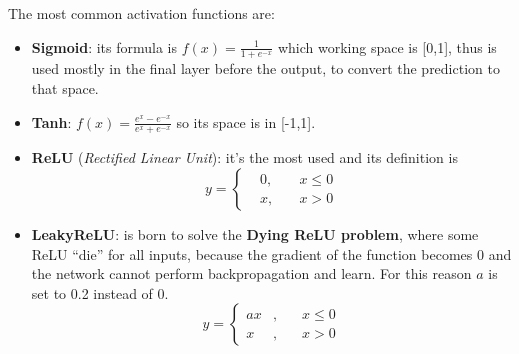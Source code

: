 \documentclass[oneside]{academica}
\begin{document}
The most common activation functions are:
\begin{itemize}
  \item \textbf{Sigmoid}: its formula is $f(x) = \displaystyle \frac{1}{1+e^{-x}}$ which working space is [0,1], thus is used mostly in the final layer before the output, to convert the prediction to that space.
  \item \textbf{Tanh}: $\displaystyle f(x) = \frac{e^x-e^{-x}}{e^x+e^{-x}}$ so its space is in [-1,1].
  \item \textbf{ReLU} (\textit{Rectified Linear Unit}): it's the most used and its definition is
    \begin{equation*}
      y = \left\{
      \begin{aligned}
        & 0, \quad & x \le 0 \\
        & x, \quad & x > 0
      \end{aligned}
      \right.
      \label{eq:ReLU}
    \end{equation*}
  \item \textbf{LeakyReLU}: is born to solve the \textbf{Dying ReLU problem}, where some ReLU ``die'' for all inputs, because the gradient of the function becomes 0 and the network cannot perform backpropagation and learn.
    For this reason $a$ is set to 0.2 instead of 0.
    \begin{equation*}
      y = \left\{
      \begin{aligned}
        ax & , \quad & x \le 0 \\
        x & , \quad & x > 0
      \end{aligned}
      \right.
      \label{eq:LeakyReLU}
    \end{equation*}
\end{itemize}
\end{document}
